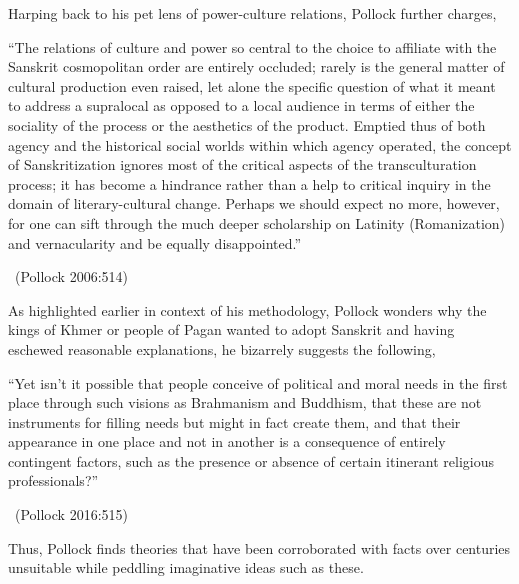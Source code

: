 Harping back to his pet lens of power-culture relations, Pollock further charges,

\begin{myquote}
“The relations of culture and power so central to the choice to affiliate with the Sanskrit cosmopolitan order are entirely occluded; rarely is the general matter of cultural production even raised, let alone the specific question of what it meant to address a supralocal as opposed to a local audience in terms of either the sociality of the process or the aesthetics of the product. Emptied thus of both agency and the historical social worlds within which agency operated, the concept of Sanskritization ignores most of the critical aspects of the transculturation process; it has become a hindrance rather than a help to critical inquiry in the domain of literary-cultural change. Perhaps we should expect no more, however, for one can sift through the much deeper scholarship on Latinity (Romanization) and vernacularity and be equally disappointed.” 

~\hfill (Pollock 2006:514)
\end{myquote}

As highlighted earlier in context of his methodology, Pollock wonders why the kings of Khmer or people of Pagan wanted to adopt Sanskrit and having eschewed reasonable explanations, he bizarrely suggests the following,

\begin{myquote}
“Yet isn’t it possible that people conceive of political and moral needs in the first place through such visions as Brahmanism and Buddhism, that these are not instruments for filling needs but might in fact create them, and that their appearance in one place and not in another is a consequence of entirely contingent factors, such as the presence or absence of certain itinerant religious professionals?” 

~\hfill (Pollock 2016:515)
\end{myquote}

\newpage

Thus, Pollock finds theories that have been corroborated with facts over centuries unsuitable while peddling imaginative ideas such as these.

